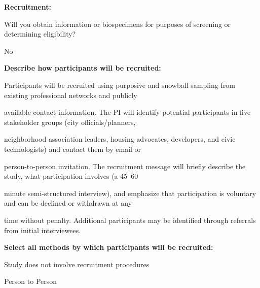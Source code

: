 \documentclass[10pt, letterpaper]{article}
\begin{document}
\noindent \textbf{Recruitment:}

\vspace{0.5em}

\vspace{0.5em}

Will you obtain information or biospecimens for purposes of screening or determining eligibility?

\vspace{0.5em}

\vspace{0.5em}

\begin{responsebox}

No

\vspace{0.5em}

\vspace{0.5em}

\end{responsebox}

\noindent \textbf{Describe how participants will be recruited:}

Participants will be recruited using purposive and snowball sampling from existing professional networks and publicly

available contact information. The PI will identify potential participants in five stakeholder groups (city officials/planners,

neighborhood association leaders, housing advocates, developers, and civic technologists) and contact them by email or

person-to-person invitation. The recruitment message will briefly describe the study, what participation involves (a 45–60

minute semi-structured interview), and emphasize that participation is voluntary and can be declined or withdrawn at any

time without penalty. Additional participants may be identified through referrals from initial interviewees.

\vspace{0.5em}

\vspace{0.5em}

\noindent \textbf{Select all methods by which participants will be recruited:}

\noindent \makebox[0pt][l]{$\square$}\hspace{1.2em} Study does not involve recruitment procedures

\noindent \makebox[0pt][l]{\color{columbiablue_official}$\boxtimes$}\hspace{1.2em} Person to Person
\end{document}
